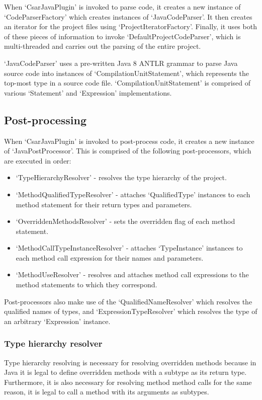 \documentclass[12pt, letterpaper]{article}
\begin{document}
When `CsarJavaPlugin' is invoked to parse code, it creates a new instance of `CodeParserFactory' which creates instances of `JavaCodeParser'.
It then creates an iterator for the project files using `ProjectIteratorFactory'.
Finally, it uses both of these pieces of information to invoke `DefaultProjectCodeParser', which is multi-threaded and carries out the parsing of the entire project.

`JavaCodeParser' uses a pre-written Java 8 ANTLR grammar to parse Java source code into instances of `CompilationUnitStatement', which represents the top-most type in a source code file.
`CompilationUnitStatement' is comprised of various `Statement' and `Expression' implementations.

\subsection{Post-processing}
When `CsarJavaPlugin' is invoked to post-process code, it creates a new instance of `JavaPostProcessor'.
This is comprised of the following post-processors, which are executed in order:
\begin{itemize}
  \item `TypeHierarchyResolver' - resolves the type hierarchy of the project.
  \item `MethodQualifiedTypeResolver' - attaches `QualifiedType' instances to each method statement for their return types and parameters.
  \item `OverriddenMethodsResolver' - sets the overridden flag of each method statement.
  \item `MethodCallTypeInstanceResolver' - attaches `TypeInstance' instances to each method call expression for their names and parameters.
  \item `MethodUseResolver' - resolves and attaches method call expressions to the method statements to which they correspond.
\end{itemize}

Post-processors also make use of the `QualifiedNameResolver' which resolves the qualified names of types, and `ExpressionTypeResolver' which resolves the type of an arbitrary `Expression' instance.

\subsubsection{Type hierarchy resolver}
Type hierarchy resolving is necessary for resolving overridden methods because in Java it is legal to define overridden methods with a subtype as its return type.
Furthermore, it is also necessary for resolving method method calls for the same reason, it is legal to call a method with its arguments as subtypes.
\end{document}

